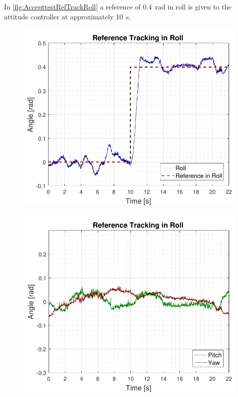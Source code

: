 In \autoref{fig:AccepttestRefTrackRoll} a reference of \SI{0.4}{rad} in roll is given to the attitude controller at approximately \SI{10}{s}.

\begin{minipage}{\linewidth}
    \begin{minipage}{0.46\linewidth}
        \begin{figure}[H]
            \includegraphics[scale=.55]{figures/AccepttestRefTrackRoll.pdf}
            \centering			
            \label{fig:AccepttestRefTrackRoll}
        \end{figure}
    \end{minipage}
    \hspace{0.03\linewidth}
    \begin{minipage}{0.46\linewidth}
        \begin{figure}[H]
            \includegraphics[scale=.55]{figures/AccepttestRefTrackRollPitchYaw.pdf}

\end{figure}
\end{minipage}
\end{minipage}
